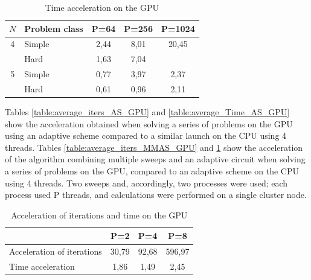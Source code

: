 \documentclass{svproc}
\begin{document}
\begin{table}
    \centering
    \begin{tabular}{|c|p{3cm}|c|c|c|}
    \hline
    \(N\) & Problem class & P=64 & P=256 & P=1024 \\ \hline
    4 & Simple &   2,44 & 8,01 & 20,45  \\ \cline{2-5}
      & Hard   &   1,63 & 7,04 &   \\ \hline
    5 & Simple &   0,77 & 3,97 & 2,37  \\ \cline{2-5}
      & Hard   &   0,61 & 0,96 & 2,11   \\ \hline
    \end{tabular}
    \caption{Time acceleration on the GPU}
    \label{table:average_Time_MMAS_GPU}
\end{table}



Tables \ref{table:average_iters_AS_GPU} and  \ref{table:average_Time_AS_GPU} show the acceleration obtained when solving a series of problems on the GPU using an adaptive scheme compared to a similar launch on the CPU using 4 threads. Tables \ref{table:average_iters_MMAS_GPU} and \ref{table:average_Time_MMAS_GPU} show the acceleration of the algorithm combining multiple sweeps and an adaptive circuit when solving a series of problems on the GPU, compared to an adaptive scheme on the CPU using 4 threads. Two sweeps and, accordingly, two processes were used; each process used P threads, and calculations were performed on a single cluster node.


\begin{table}
    \centering
    \begin{tabular}{|p{4cm}|c|c|c|}
    \hline
      & P=2 & P=4 & P=8 \\ \hline
    Acceleration of iterations&   30,79 & 92,68 & 596,97  \\ \hline
    Time acceleration         &   1,86  & 1,49  & 2,45    \\ \hline

    \end{tabular}
    \caption{Acceleration of iterations and time on the GPU}
    \label{table:GKLS6_average_MMAS_GPU}
\end{table}

\end{document}
